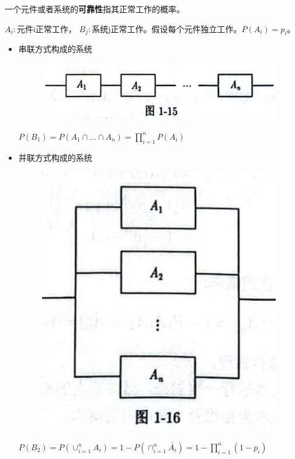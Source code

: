 \documentclass{beamer}
\begin{document}
	\begin{frame}
		一个元件或者系统的\textbf{可靠性}指其正常工作的概率。
		
		$A_i: \text{元件i正常工作}$， $B_j: \text{系统j正常工作}$。假设每个元件独立工作。$P(A_i) = p_i$。
		\begin{itemize}
			\item 串联方式构成的系统
			\begin{figure}[H]
				\centering
				\includegraphics[scale = 0.3]{figures/figure1-15.png}
			\end{figure}
			$P(B_1) = P(A_1 \cap \dots \cap A_n) = \prod_{i = 1}^{n}P(A_i)$
			\item 并联方式构成的系统
			\begin{figure}[H]
			\centering
			\includegraphics[scale = 0.2]{figures/figure1-16.png}
			\end{figure}
			$P(B_2) = P(\cup_{i = 1}^{n}A_i) = 1 - P(\cap_{i = 1}^n\bar{A_i}) = 1 - \prod_{i = 1}^{n}(1 - p_i)$
		\end{itemize}
	\end{frame}
	
\end{document}
